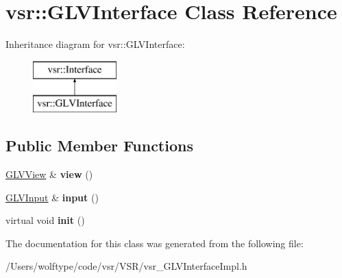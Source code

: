 \hypertarget{classvsr_1_1_g_l_v_interface}{\section{vsr\-:\-:G\-L\-V\-Interface Class Reference}
\label{classvsr_1_1_g_l_v_interface}
}
Inheritance diagram for vsr\-:\-:G\-L\-V\-Interface\-:\begin{figure}[H]
\begin{center}
\leavevmode
\includegraphics[height=2.000000cm]{classvsr_1_1_g_l_v_interface}
\end{center}
\end{figure}
\subsection*{Public Member Functions}
\begin{DoxyCompactItemize}
\item 
\hypertarget{classvsr_1_1_g_l_v_interface_aba6d7c68d1b63fbf8a701b8c15557e49}{\hyperlink{structvsr_1_1_g_l_v_view}{G\-L\-V\-View} \& {\bfseries view} ()}\label{classvsr_1_1_g_l_v_interface_aba6d7c68d1b63fbf8a701b8c15557e49}

\item 
\hypertarget{classvsr_1_1_g_l_v_interface_a05ddd009f56b47ea1e76f4f0169ba484}{\hyperlink{structvsr_1_1_g_l_v_input}{G\-L\-V\-Input} \& {\bfseries input} ()}\label{classvsr_1_1_g_l_v_interface_a05ddd009f56b47ea1e76f4f0169ba484}

\item 
\hypertarget{classvsr_1_1_g_l_v_interface_a73a59f1e5e2b131aca900d789543d14d}{virtual void {\bfseries init} ()}\label{classvsr_1_1_g_l_v_interface_a73a59f1e5e2b131aca900d789543d14d}

\end{DoxyCompactItemize}


The documentation for this class was generated from the following file\-:\begin{DoxyCompactItemize}
\item 
/\-Users/wolftype/code/vsr/\-V\-S\-R/vsr\-\_\-\-G\-L\-V\-Interface\-Impl.\-h\end{DoxyCompactItemize}
